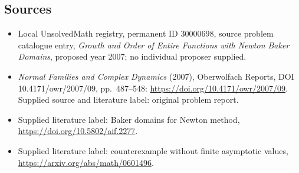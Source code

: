 \documentclass[11pt]{article}
\begin{document}
\subsection{Sources}
\begin{itemize}\item Local UnsolvedMath registry, permanent ID 30000698, source problem catalogue entry, \emph{Growth and Order of Entire Functions with Newton Baker Domains}, proposed year 2007; no individual proposer supplied.\item \emph{Normal Families and Complex Dynamics} (2007), Oberwolfach Reports, DOI 10.4171/owr/2007/09, pp.\ 487--548: \url{https://doi.org/10.4171/owr/2007/09}. Supplied source and literature label: original problem report.\item Supplied literature label: Baker domains for Newton method, \url{https://doi.org/10.5802/aif.2277}.\item Supplied literature label: counterexample without finite asymptotic values, \url{https://arxiv.org/abs/math/0601496}.\end{itemize}
\end{document}
